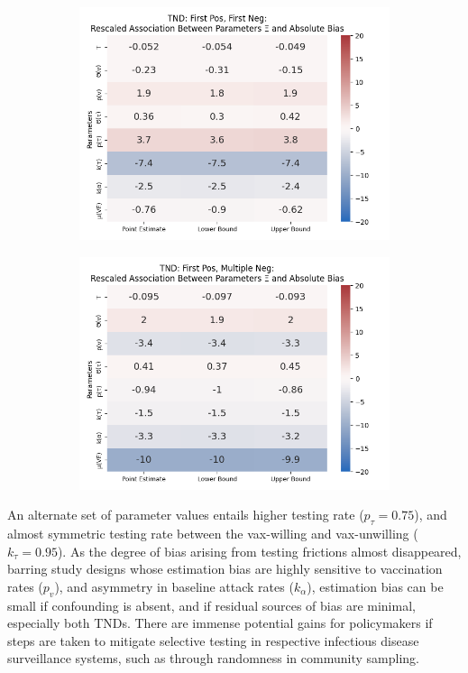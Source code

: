 \documentclass[12pt]{article}
\begin{document}
\begin{figure}[H]
	\begin{subfigure}[t]{0.23\linewidth}
		\centering
		\caption{}
		\includegraphics[scale=0.25]{VEMethod_Drivers1b_FEest_Realistic_Li_MSpec_Heatmap9.png}
	\end{subfigure}
	\begin{subfigure}[t]{0.23\linewidth}
		\centering
		\caption{}
		\includegraphics[scale=0.25]{VEMethod_Drivers1b_FEest_Realistic_Li_MSpec_Heatmap10.png}
	\end{subfigure}
\end{figure}

An alternate set of parameter values entails higher testing rate ($p_\tau=0.75$), and almost symmetric testing rate between the vax-willing and vax-unwilling ($k_\tau=0.95$). As the degree of bias arising from testing frictions almost disappeared, barring study designs whose estimation bias are highly sensitive to vaccination rates ($p_v$), and asymmetry in baseline attack rates ($k_\alpha$), estimation bias can be small if confounding is absent, and if residual sources of bias are minimal, especially both TNDs. There are immense potential gains for policymakers if steps are taken to mitigate selective testing in respective infectious disease surveillance systems, such as through randomness in community sampling.
\end{document}
